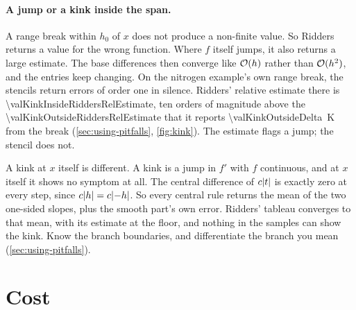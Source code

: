 \paragraph{A jump or a kink inside the span.} A range break within $h_0$ of $x$ does not produce a non-finite value.
So Ridders returns a value for the wrong function. Where $f$ itself jumps, it also returns a large estimate. The base
differences then converge like $\mathcal{O}(h)$ rather than $\mathcal{O}(h^2)$, and the entries keep changing. On the nitrogen
example's own range break, the stencils return errors of order one in silence. Ridders' relative estimate there is
\num{\valKinkInsideRiddersRelEstimate}, ten orders of magnitude above the \num{\valKinkOutsideRiddersRelEstimate}
that it reports \SI{\valKinkOutsideDelta}{\kelvin} from the break (\cref{sec:using-pitfalls}, \cref{fig:kink}). The
estimate flags a jump; the stencil does not.

A kink at $x$ itself is different. A kink is a jump in $f'$ with $f$ continuous, and at $x$ itself it shows no
symptom at all. The central difference of $c \lvert t \rvert$ is exactly zero at every step, since $c \lvert h \rvert = c \lvert -h \rvert$.
So every central rule returns the mean of the two one-sided slopes, plus the smooth part's own error. Ridders'
tableau converges to that mean, with its estimate at the floor, and nothing in the samples can show the kink. Know
the branch boundaries, and differentiate the branch you mean (\cref{sec:using-pitfalls}).

\section{Cost}\label{sec:ridders-cost}

\begin{marginfigure}
\centering

\caption{The number of evaluations of  per call over the random study: $\dorder = 1$ dark, $\dorder = 2$
muted. The tail of $\dorder = 2$ comes from the slower convergence of several functions. It does not come from the
restarts, which are a small part of its last bar (\cref{sec:ridders-cost}).\label{fig:ridders-cost}}
\end{marginfigure}


